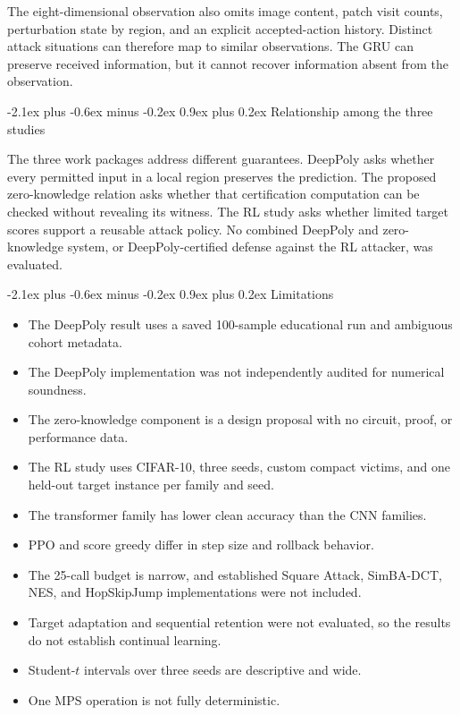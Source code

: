 \documentclass[11pt,a4paper]{article}
\makeatletter
\renewcommand\subsection{\@startsection{subsection}{2}{0pt}
  {-2.1ex plus -0.6ex minus -0.2ex}
  {0.9ex plus 0.2ex}
  {\normalfont\normalsize\bfseries\color{researchnavy}}}
\makeatother
\begin{document}
The eight-dimensional observation also omits image content, patch visit counts, perturbation state by region, and an explicit accepted-action history. Distinct attack situations can therefore map to similar observations. The GRU can preserve received information, but it cannot recover information absent from the observation.

\subsection{Relationship among the three studies}

The three work packages address different guarantees. DeepPoly asks whether every permitted input in a local region preserves the prediction. The proposed zero-knowledge relation asks whether that certification computation can be checked without revealing its witness. The RL study asks whether limited target scores support a reusable attack policy. No combined DeepPoly and zero-knowledge system, or DeepPoly-certified defense against the RL attacker, was evaluated.

\subsection{Limitations}

\begin{itemize}
  \item The DeepPoly result uses a saved 100-sample educational run and ambiguous cohort metadata.
  \item The DeepPoly implementation was not independently audited for numerical soundness.
  \item The zero-knowledge component is a design proposal with no circuit, proof, or performance data.
  \item The RL study uses CIFAR-10, three seeds, custom compact victims, and one held-out target instance per family and seed.
  \item The transformer family has lower clean accuracy than the CNN families.
  \item PPO and score greedy differ in step size and rollback behavior.
  \item The 25-call budget is narrow, and established Square Attack, SimBA-DCT, NES, and HopSkipJump implementations were not included.
  \item Target adaptation and sequential retention were not evaluated, so the results do not establish continual learning.
  \item Student-\(t\) intervals over three seeds are descriptive and wide.
  \item One MPS operation is not fully deterministic.
\end{itemize}
\end{document}
